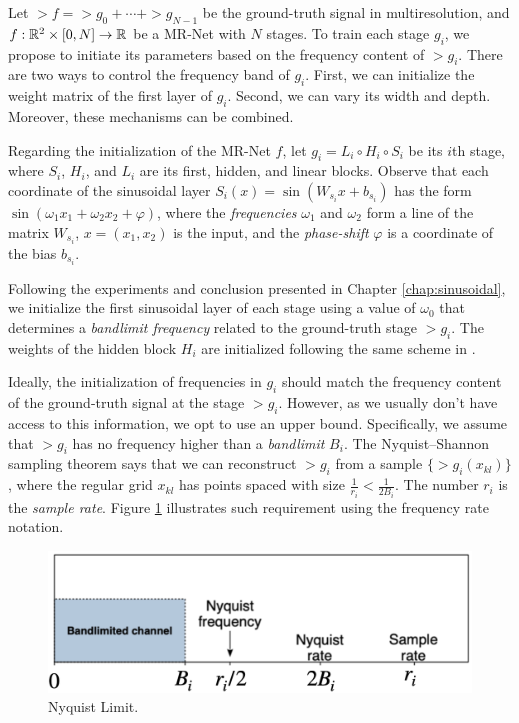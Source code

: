 Let $\gt{f}=\gt{g}_0+\cdots+\gt{g}_{N-1}$ be the ground-truth signal in multiresolution, and $f:\mathbb{R}^2\times [0,N]\to \mathbb{R}$ be a MR-Net with $N$ stages. To train each stage $g_i$, we propose to initiate its parameters based on the frequency content of $\gt{g}_i$.
There are two ways to control the frequency band of $g_i$. First, we can initialize the weight matrix of the first layer of $g_i$. Second, we can vary its width and depth. Moreover, these mechanisms can be combined.

Regarding the initialization of the MR-Net $f$, let $g_i=L_i\circ H_i\circ S_i$ be its $i$th stage, where $S_i$, $H_i$, and $L_i$ are its first, hidden, and linear blocks.
Observe that each coordinate of the sinusoidal layer $S_i(x)=\sin\left(W_{s_i} x+b_{s_i}\right)$ has the form $\sin(\omega_1 x_1 +\omega_2 x_2 + \varphi)$, where the \textit{frequencies} $\omega_1$ and $\omega_2$ form a line of the matrix $W_{s_i}$, $x=(x_1,x_2)$ is the input, and the \textit{phase-shift} $ \varphi$ is a coordinate of the bias $b_{s_i}$. 

Following the experiments and conclusion presented in Chapter \ref{chap:sinusoidal}, we initialize the first sinusoidal layer of each stage using a value of $\omega_0$ that determines a \textit{bandlimit frequency} related to the ground-truth stage $\gt{g}_i$. The weights of the hidden block $H_i$ are initialized following the same scheme in \cite{sitzmann2019siren}.

Ideally, the initialization of frequencies in $g_i$ should match the frequency content of the ground-truth signal at the stage $\gt{g}_i$. However, as we usually don't have access to this information, we opt to use an upper bound. Specifically, we assume that $\gt{g}_i$ has no frequency higher than a \textit{bandlimit} $B_i$. The Nyquist–Shannon sampling theorem says that we can reconstruct $\gt{g}_i$ from a sample $\{\gt{g}_i(x_{kl})\}$, where the regular grid $x_{kl}$ has points spaced with size $\frac{1}{r_i}<\frac{1}{2B_i}$. The number $r_i$ is the \textit{sample rate}. Figure \ref{f:nyquist} illustrates such requirement using the frequency rate notation.  

\begin{figure}[!h]
\centering
\includegraphics[width=0.7\linewidth]{img/ch4/nyquist.png}
\caption{Nyquist Limit.}
\label{f:nyquist}
\end{figure}


